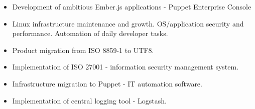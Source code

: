 \documentclass[10pt,a4paper]{altacv}
\begin{document}

\begin{fullwidth}
\makecvheader
\end{fullwidth}



\begin{itemize}
  \item Development of ambitious Ember.js applications - Puppet Enterprise Console
\end{itemize}

\divider

\begin{itemize}
  \item Linux infrastructure maintenance and growth. OS/application security and performance. Automation of daily developer tasks.
  \item Product migration from ISO 8859-1 to UTF8.
  \item Implementation of ISO 27001 - information security management system.
  \item Infrastructure migration to Puppet - IT automation software.
  \item Implementation of central logging tool - Logstash.
\end{itemize}
\end{document}
